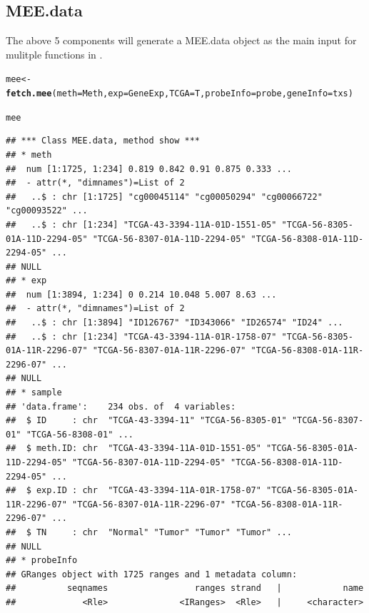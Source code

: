 \documentclass{article}\usepackage[]{graphicx}\usepackage[]{color}
\makeatletter
\newcommand{\hlstd}[1]{\textcolor[rgb]{0.345,0.345,0.345}{#1}}%
\newcommand{\hlkwb}[1]{\textcolor[rgb]{0.69,0.353,0.396}{#1}}%
\newcommand{\hlkwc}[1]{\textcolor[rgb]{0.333,0.667,0.333}{#1}}%
\newcommand{\hlkwd}[1]{\textcolor[rgb]{0.737,0.353,0.396}{\textbf{#1}}}%
\newenvironment{kframe}{%
 \def\at@end@of@kframe{}%
 \ifinner\ifhmode%
  \def\at@end@of@kframe{\end{minipage}}%
  \begin{minipage}{\columnwidth}%
 \fi\fi%
 \def\FrameCommand##1{\hskip\@totalleftmargin \hskip-\fboxsep
 \colorbox{shadecolor}{##1}\hskip-\fboxsep
     \hskip-\linewidth \hskip-\@totalleftmargin \hskip\columnwidth}%
 \MakeFramed {\advance\hsize-\width
   \@totalleftmargin\z@ \linewidth\hsize
   \@setminipage}}%
 {\par\unskip\endMakeFramed%
 \at@end@of@kframe}
\newenvironment{knitrout}{}{} %
\makeatother
\begin{document}
\subsection{MEE.data}
The above 5 components will generate a MEE.data object as the main input for mulitple functions 
in .

\begin{knitrout}
\color{fgcolor}\begin{kframe}
\begin{alltt}
\hlstd{mee} \hlkwb{<-} \hlkwd{fetch.mee}\hlstd{(}\hlkwc{meth}\hlstd{=Meth,} \hlkwc{exp}\hlstd{=GeneExp,} \hlkwc{TCGA}\hlstd{=T,} \hlkwc{probeInfo}\hlstd{=probe,} \hlkwc{geneInfo}\hlstd{=txs)}
\end{alltt}


{\ttfamily\noindent\itshape{}}\begin{alltt}
\hlstd{mee}
\end{alltt}
\begin{verbatim}
## *** Class MEE.data, method show *** 
## * meth 
##  num [1:1725, 1:234] 0.819 0.842 0.91 0.875 0.333 ...
##  - attr(*, "dimnames")=List of 2
##   ..$ : chr [1:1725] "cg00045114" "cg00050294" "cg00066722" "cg00093522" ...
##   ..$ : chr [1:234] "TCGA-43-3394-11A-01D-1551-05" "TCGA-56-8305-01A-11D-2294-05" "TCGA-56-8307-01A-11D-2294-05" "TCGA-56-8308-01A-11D-2294-05" ...
## NULL
## * exp 
##  num [1:3894, 1:234] 0 0.214 10.048 5.007 8.63 ...
##  - attr(*, "dimnames")=List of 2
##   ..$ : chr [1:3894] "ID126767" "ID343066" "ID26574" "ID24" ...
##   ..$ : chr [1:234] "TCGA-43-3394-11A-01R-1758-07" "TCGA-56-8305-01A-11R-2296-07" "TCGA-56-8307-01A-11R-2296-07" "TCGA-56-8308-01A-11R-2296-07" ...
## NULL
## * sample 
## 'data.frame':	234 obs. of  4 variables:
##  $ ID     : chr  "TCGA-43-3394-11" "TCGA-56-8305-01" "TCGA-56-8307-01" "TCGA-56-8308-01" ...
##  $ meth.ID: chr  "TCGA-43-3394-11A-01D-1551-05" "TCGA-56-8305-01A-11D-2294-05" "TCGA-56-8307-01A-11D-2294-05" "TCGA-56-8308-01A-11D-2294-05" ...
##  $ exp.ID : chr  "TCGA-43-3394-11A-01R-1758-07" "TCGA-56-8305-01A-11R-2296-07" "TCGA-56-8307-01A-11R-2296-07" "TCGA-56-8308-01A-11R-2296-07" ...
##  $ TN     : chr  "Normal" "Tumor" "Tumor" "Tumor" ...
## NULL
## * probeInfo 
## GRanges object with 1725 ranges and 1 metadata column:
##          seqnames                 ranges strand   |            name
##             <Rle>              <IRanges>  <Rle>   |     <character>

\end{verbatim}
\end{kframe}
\end{knitrout}
\end{document}

